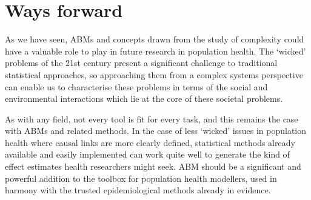 \documentclass[review]{elsarticle}
\begin{document}



\section{Ways forward}

As we have seen, ABMs and concepts drawn from the study of complexity could have a valuable role to play in future research in population health.  The `wicked' problems of the 21st century present a significant challenge to traditional statistical approaches, so approaching them from a complex systems perspective can enable us to characterise these problems in terms of the social and environmental interactions which lie at the core of these societal problems.

As with any field, not every tool is fit for every task, and this remains the case with ABMs and related methods.  In the case of less `wicked' issues in population health where causal links are more clearly defined, statistical methods already available and easily implemented can work quite well to generate the kind of effect estimates health researchers might seek.  ABM should be a significant and powerful addition to the toolbox for population health modellers, used in harmony with the trusted epidemiological methods already in evidence.   
\end{document}
